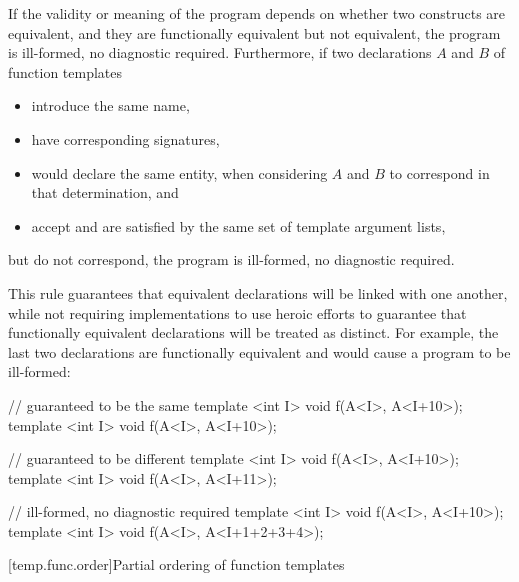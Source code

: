 \pnum
If the validity or meaning of the program depends on
whether two constructs are equivalent, and they are
functionally equivalent but not equivalent, the program is ill-formed,
no diagnostic required.
Furthermore, if two declarations $A$ and $B$ of function templates
\begin{itemize}
\item
introduce the same name,
\item
have corresponding signatures,
\item
would declare the same entity,
when considering $A$ and $B$ to correspond in that determination, and
\item
accept and are satisfied by the same set of template argument lists,
\end{itemize}
but do not correspond,
the program is ill-formed, no diagnostic required.

\pnum
\begin{note}
This rule guarantees that equivalent declarations will be linked with
one another, while not requiring implementations to use heroic efforts
to guarantee that functionally equivalent declarations will be treated
as distinct.
For example, the last two declarations are functionally
equivalent and would cause a program to be ill-formed:

\begin{codeblock}
// guaranteed to be the same
template <int I> void f(A<I>, A<I+10>);
template <int I> void f(A<I>, A<I+10>);

// guaranteed to be different
template <int I> void f(A<I>, A<I+10>);
template <int I> void f(A<I>, A<I+11>);

// ill-formed, no diagnostic required
template <int I> void f(A<I>, A<I+10>);
template <int I> void f(A<I>, A<I+1+2+3+4>);
\end{codeblock}
\end{note}

[temp.func.order]{Partial ordering of function templates}

